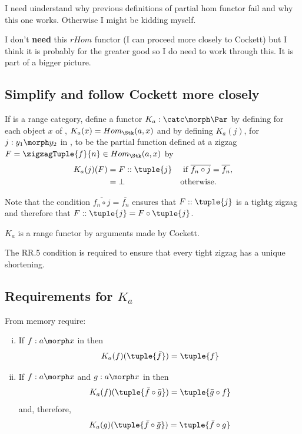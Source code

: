 \begin{aside}
I need uinderstand why previous definitions of partial hom functor fail and why this one works. Otherwise I might be kidding myself.
\end{aside}

\begin{aside}
 I don't \textbf{need} this $rHom$ functor (I can proceed more closely to Cockett) but I think it is probably for the greater good so I do need to work through this. It is part of a bigger picture.
\end{aside} 

\subsection{Simplify and follow Cockett more closely}
If \catcw is a range category, define a functor $K_a: \catc \morph \Par$ by defining for each object $x$ of \catc, $K_a(x)=Hom_{\Stk}(a,x)$ and by defining $K_a(j)$, for $j:y_1 \morph y_2$ in \catc, to be the partial function  defined at a zigzag 
$F=\zigzagTuple{f}{n}\in Hom_{\Stk}(a,x)$ by
\begin{align*}
K_a(j)(F) &= F :: \tuple{j}  &&\mbox{ if $\overline{f_n \circ j} = \overline{f_n}$,} \\
             &=\bot        && \mbox{otherwise.}
\end{align*}

Note that the condition $\overline{f_n \circ j} = \overline{f_n}$ ensures
that $F :: \tuple{j}$ is a tightg zigzag and therefore that
$F :: \tuple{j}= F \circ \tuple{j}$.

$K_a$ is a range functor by arguments made by Cockett.

The RR.5 condition is required to ensure that every tight
zigzag has a unique shortening. 




\subsection{Requirements for $K_a$}

From memory require:
\begin{enumerate}[(i)]
\item If $f: a \morph x$ in \catcw then 
\[
K_a(f)(\tuple{\bar{f}})=\tuple{f}
\]
\item If $f: a \morph x$ and $g: a \morph x$ in \catcw then 
\[
K_a(f)(\tuple{\bar{f}\circ\bar{g}})=\tuple{\bar{g} \circ f}
\]
and, therefore,
\[
K_a(g)(\tuple{\bar{f}\circ\bar{g}})=\tuple{\bar{f} \circ g}
\]
\end{enumerate}


